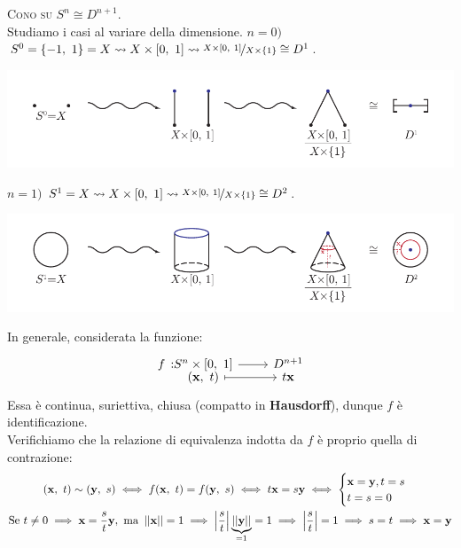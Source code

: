 \begin{example} \textsc{Cono su} $S^n \cong D^{n+1}$.\\
	Studiamo i casi al variare della dimensione.
	$n=0)$ $S^0=\{-1, \ 1\}=X \rightsquigarrow X\times\left[0,\ 1\right] \rightsquigarrow \nicefrac{X\times\left[0,\ 1\right]}{X\times \{1\}} \cong D^1$.
\begin{center}
	\includegraphics[trim=0cm 0cm 0cm 0cm,clip,scale=0.9]{images/cones0.pdf}
\end{center}
	$n=1)$ $S^1=X \rightsquigarrow X\times\left[0,\ 1\right] \rightsquigarrow \nicefrac{X\times\left[0,\ 1\right]}{X\times \{1\}} \cong D^2$.
\begin{center}
	\includegraphics[trim=0cm 0cm 0cm 0cm,clip,scale=0.9]{images/cones1.pdf}
\end{center}
	In generale, considerata la funzione:
	\begin{equation*}
		\funztot f {S^n\times\intv} {D^{n+1}} {(\mathbf{x}, \ t)} {t\mathbf{x}}
	\end{equation*}
	Essa è continua, suriettiva, chiusa (compatto in \textbf{Hausdorff}), dunque $f$ è identificazione.\\
	Verifichiamo che la relazione di equivalenza indotta da $f$ è proprio quella di contrazione:
		\begin{gather*}
			(\mathbf{x}, \ t)\sim (\mathbf{y}, \ s) \iff f(\mathbf{x}, \ t)=f(\mathbf{y}, \ s) \iff t\mathbf{x}=s\mathbf{y} \iff \begin{cases} 
				\mathbf{x=y}, t=s \\ 
				t=s=0 
			\end{cases}\\
			\text{Se } t\neq 0 \implies \mathbf{x}=\frac{s}{t}\mathbf{y}, \text{ ma } \labs\mathbf{x}\rabs=1 \implies \left| \frac{s}{t} \right| \underbrace{\labs\mathbf{y}\rabs}_{=1}=1 \implies \left| \frac{s}{t} \right| =1 \implies s=t \implies \mathbf{x=y}
		\end{gather*}
	\vspace{-6mm}
\end{example}
